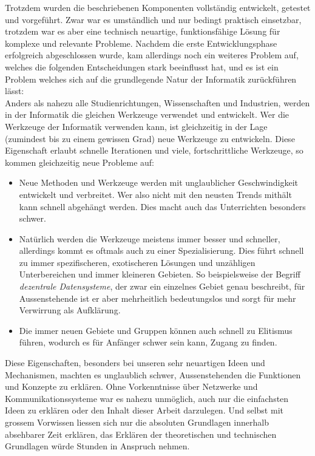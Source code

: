 \documentclass[11pt]{article}
\begin{document}
\noindent Trotzdem wurden die beschriebenen Komponenten vollständig
entwickelt, getestet und vorgeführt. Zwar war es umständlich und nur
bedingt praktisch einsetzbar, trotzdem war es aber eine technisch
neuartige, funktionsfähige Lösung für komplexe und relevante Probleme.
Nachdem die erste Entwicklungsphase erfolgreich abgeschlossen wurde,
kam allerdings noch ein weiteres Problem auf, welches die folgenden
Entscheidungen stark beeinflusst hat, und es ist ein Problem welches
sich auf die grundlegende Natur der Informatik zurückführen lässt:\\
Anders als nahezu alle Studienrichtungen, Wissenschaften und
Industrien, werden in der Informatik die gleichen Werkzeuge verwendet
und entwickelt. Wer die Werkzeuge der Informatik verwenden kann, ist
gleichzeitig in der Lage (zumindest bis zu einem gewissen Grad) neue
Werkzeuge zu entwickeln. Diese Eigenschaft erlaubt schnelle
Iterationen und viele, fortschrittliche Werkzeuge, so kommen
gleichzeitig neue Probleme auf:
\begin{itemize}
\item Neue Methoden und Werkzeuge werden mit unglaublicher Geschwindigkeit
entwickelt und verbreitet. Wer also nicht mit den neusten Trends
mithält kann schnell abgehängt werden. Dies macht auch das
Unterrichten besonders schwer.
\item Natürlich werden die Werkzeuge meistens immer besser und schneller,
allerdings kommt es oftmals auch zu einer Spezialisierung. Dies
führt schnell zu immer spezifischeren, exotischeren Lösungen und
unzähligen Unterbereichen und immer kleineren Gebieten. So
beispielsweise der Begriff \emph{dezentrale Datensysteme}, der zwar ein
einzelnes Gebiet genau beschreibt, für Aussenstehende ist er aber
mehrheitlich bedeutungslos und sorgt für mehr Verwirrung als
Aufklärung.
\item Die immer neuen Gebiete und Gruppen können auch schnell zu Elitismus
führen, wodurch es für Anfänger schwer sein kann, Zugang zu finden.
\end{itemize}

Diese Eigenschaften, besonders bei unseren sehr neuartigen Ideen und
Mechanismen, machten es unglaublich schwer, Aussenstehenden die
Funktionen und Konzepte zu erklären. Ohne Vorkenntnisse über Netzwerke
und Kommunikationssysteme war es nahezu unmöglich, auch nur die
einfachsten Ideen zu erklären oder den Inhalt dieser Arbeit
darzulegen. Und selbst mit grossem Vorwissen liessen sich nur die
absoluten Grundlagen innerhalb absehbarer Zeit erklären, das Erklären
der theoretischen und technischen Grundlagen würde Stunden in Anspruch
nehmen.\\
\end{document}
